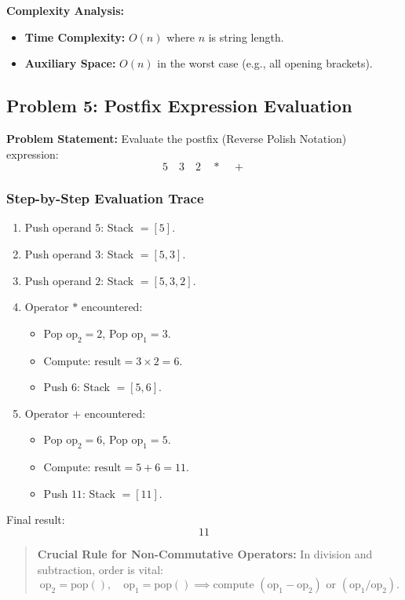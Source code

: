 \textbf{Complexity Analysis:}
\begin{itemize}
    \item \textbf{Time Complexity:} $O(n)$ where $n$ is string length.
    \item \textbf{Auxiliary Space:} $O(n)$ in the worst case (e.g., all opening brackets).
\end{itemize}

\subsection{Problem 5: Postfix Expression Evaluation}

\textbf{Problem Statement:} Evaluate the postfix (Reverse Polish Notation) expression:
\[
5 \quad 3 \quad 2 \quad * \quad +
\]

\subsubsection*{Step-by-Step Evaluation Trace}
\begin{enumerate}
    \item Push operand $5$: Stack $= [5]$.
    \item Push operand $3$: Stack $= [5, 3]$.
    \item Push operand $2$: Stack $= [5, 3, 2]$.
    \item Operator $*$ encountered:
    \begin{itemize}
        \item Pop $\text{op}_2 = 2$, Pop $\text{op}_1 = 3$.
        \item Compute: $\text{result} = 3 \times 2 = 6$.
        \item Push $6$: Stack $= [5, 6]$.
    \end{itemize}
    \item Operator $+$ encountered:
    \begin{itemize}
        \item Pop $\text{op}_2 = 6$, Pop $\text{op}_1 = 5$.
        \item Compute: $\text{result} = 5 + 6 = 11$.
        \item Push $11$: Stack $= [11]$.
    \end{itemize}
\end{enumerate}
Final result:
\[
\boxed{11}
\]

\begin{quote}
\textbf{Crucial Rule for Non-Commutative Operators:} In division and subtraction, order is vital:
\[
\text{op}_2 = \text{pop}(), \quad \text{op}_1 = \text{pop}() \implies \text{compute } (\text{op}_1 - \text{op}_2) \text{ or } (\text{op}_1 / \text{op}_2).
\]
\end{quote}

